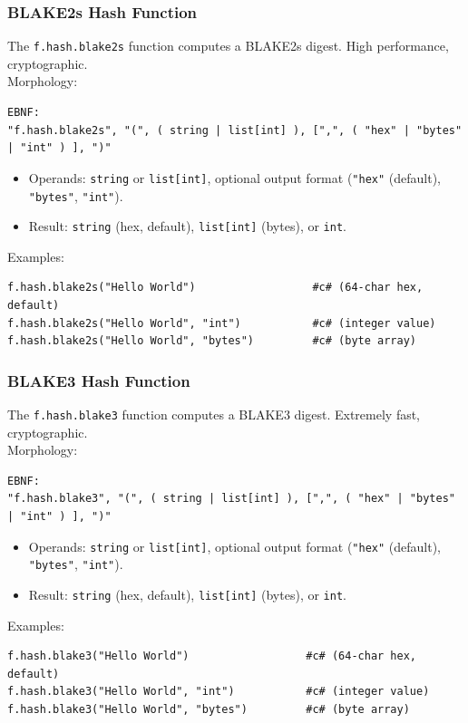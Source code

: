 \subsubsection{BLAKE2s Hash Function}
The \texttt{f.hash.blake2s} function computes a BLAKE2s digest. High performance, cryptographic. \\
Morphology:
\begin{verbatim}
EBNF:
"f.hash.blake2s", "(", ( string | list[int] ), [",", ( "hex" | "bytes" | "int" ) ], ")"
\end{verbatim}
\begin{itemize}
\item Operands: \texttt{string} or \texttt{list[int]}, optional output format (\texttt{"hex"} (default), \texttt{"bytes"}, \texttt{"int"}).
\item Result: \texttt{string} (hex, default), \texttt{list[int]} (bytes), or \texttt{int}.
\end{itemize}
Examples:
\begin{verbatim}
f.hash.blake2s("Hello World")                  #c# (64-char hex, default)
f.hash.blake2s("Hello World", "int")           #c# (integer value)
f.hash.blake2s("Hello World", "bytes")         #c# (byte array)
\end{verbatim}

\subsubsection{BLAKE3 Hash Function}
The \texttt{f.hash.blake3} function computes a BLAKE3 digest. Extremely fast, cryptographic. \\
Morphology:
\begin{verbatim}
EBNF:
"f.hash.blake3", "(", ( string | list[int] ), [",", ( "hex" | "bytes" | "int" ) ], ")"
\end{verbatim}
\begin{itemize}
\item Operands: \texttt{string} or \texttt{list[int]}, optional output format (\texttt{"hex"} (default), \texttt{"bytes"}, \texttt{"int"}).
\item Result: \texttt{string} (hex, default), \texttt{list[int]} (bytes), or \texttt{int}.
\end{itemize}
Examples:
\begin{verbatim}
f.hash.blake3("Hello World")                  #c# (64-char hex, default)
f.hash.blake3("Hello World", "int")           #c# (integer value)
f.hash.blake3("Hello World", "bytes")         #c# (byte array)
\end{verbatim}

